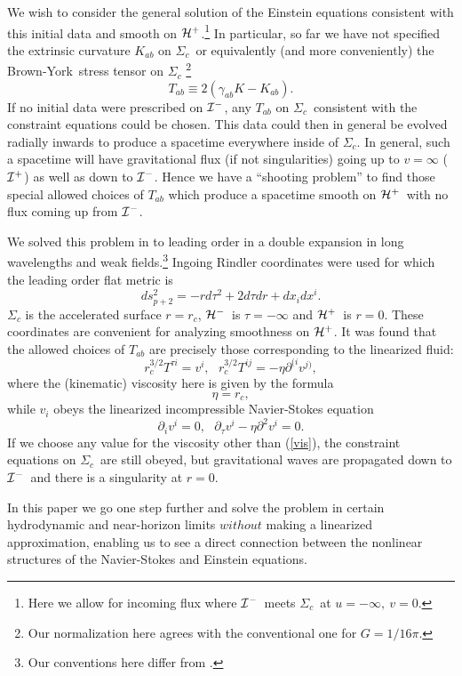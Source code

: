 \documentclass{article}
\def\beq{\begin{equation}}
\def\eeq{\end{equation}}
\def\p{\partial}
\def\im{${\cal I}^-$}
\def\sc{$\Sigma_c$}
\def\brownyork{Brown-York}
\def\hm{${\cal H}^-$}
\def\hp{${\cal H}^+$}
\begin{document}
We wish to consider the general solution of the Einstein equations consistent with this initial data and smooth on \hp.\footnote{Here we allow for incoming flux where \im\  meets \sc\ at $u=-\infty, ~v=0$.}
 In particular, so far we have not specified the extrinsic curvature $ K_{ab}$  on
\sc\ or equivalently (and more conveniently) the \brownyork\ stress tensor on \sc
\footnote{Our normalization here agrees with the conventional one for $G=1/16\pi.$}
%
\beq
T_{ab}  \equiv 2(\gamma_{ab} K -K_{ab} ).
\eeq
%
 If no initial data were prescribed on \im, any $ T_{ab}$ on \sc\ consistent with the constraint equations could be chosen.  This data could then in general be evolved radially inwards to produce a spacetime everywhere inside of \sc. In general, such a spacetime will have gravitational flux (if not singularities) going up to $v=\infty$ (${\cal I}^+$) as well as down to \im. Hence we have a ``shooting problem'' to find those special allowed choices of $ T_{ab}$ which produce a spacetime smooth on \hp\ with no flux coming up from \im.




We solved this problem in \cite{bkls} to leading order in a double expansion in long wavelengths and weak fields.\footnote{Our conventions here differ from \cite{bkls}.}
 Ingoing Rindler coordinates were used for which the leading order flat metric is
%
\beq
 \label{mcs} ds_{p+2}^2=-rd\tau^2+2d\tau dr+dx_idx^i.
\eeq
%
$\Sigma_c$ is the accelerated surface $r=r_c$, \hm\ is $\tau=-\infty$ and \hp\ is $r=0$.
These coordinates are convenient for analyzing smoothness on \hp.
It was found that the allowed choices of $T_{ab}$
are precisely those corresponding to the linearized fluid:
%
\beq
 r_c^{3/2} T^{\tau i}=v^i,~~~r_c^{3/2}T^{ij}=-\eta \p^{(i }v^{j)},
\eeq
%
where the (kinematic) viscosity here is given by the formula%
\beq\label{vis}
\eta= r_c,
\eeq
%
while $v_i$ obeys the linearized incompressible Navier-Stokes equation
%
\beq
\p_iv^i=0, ~~~\p_\tau v^i-\eta\p^2v^i=0.
\eeq
%
If we choose any value for the viscosity other than (\ref{vis}), the constraint equations on \sc\ are still obeyed, but gravitational waves are propagated down to \im\ and there is a singularity at $r=0$.

In this paper we go one step further and solve the problem in certain hydrodynamic and near-horizon limits  $without$  making a linearized approximation, enabling us to see a direct connection between the nonlinear structures of the Navier-Stokes and Einstein equations.
\end{document}
